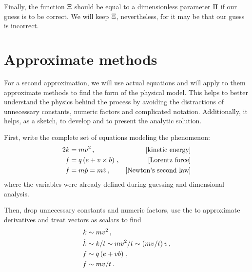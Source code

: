 Finally, the function $\Xi$ should be equal to a dimensionless parameter $\Pi$ if our guess is to be correct. We will keep $\Xi$, nevertheless, for it may be that our guess is incorrect.


\section{Approximate methods}
%
For a second approximation, we will use actual equations and will apply to them approximate methods to find the form of the physical model. 
%
%
This helps to better understand the physics behind the process by avoiding the distractions of unnecessary constants, numeric factors and complicated notation. Additionally, it helps, as a sketch, to develop and to present the analytic solution.

First, write the complete set of equations modeling the phenomenon:
%
\begin{align*}
  2k &= mv^2\,,                                 &[\text{kinetic energy}] \\
  f &= q\left({e + v\times b}\right)\,, &[\text{Lorentz force}] \\
  f &= m\dot{p} = m\dot{v}\,,                 &[\text{Newton's second law}]
\end{align*}
%
where the variables were already defined during guessing and dimensional analysis. 

Then, drop unnecessary constants and numeric factors, use the  to approximate derivatives and treat vectors as scalars to find
%
~
%
\begin{align*}
  k    &\sim mv^2\,, \\
  \dot{k} &\sim k/t \sim mv^2/t \sim \left({mv/t}\right)v\,, \\
  f   &\sim q\left({e + vb}\right)\,, \\
  f   &\sim mv/t\,.
\end{align*}

